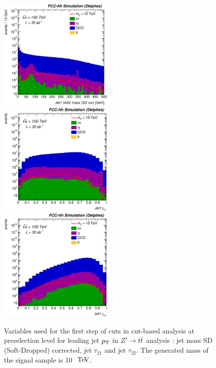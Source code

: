\documentclass{cernrep}
\begin{document}
\begin{figure}[!htb]\centering
\includegraphics[width=0.495\textwidth]{Fig/Zptt/Jet1_trk02_SD_Cor_m_sel0_nostack_log.eps}
\includegraphics[width=0.495\textwidth]{Fig/Zptt/Jet1_tau21_sel0_nostack_log.eps}
\includegraphics[width=0.495\textwidth]{Fig/Zptt/Jet1_tau32_sel0_nostack_log.eps}
\caption{Variables used for the first step of cuts in cut-based analysis at preselection level for leading jet $p\sb{\scriptstyle\mathrm{T}}$ in $Z^{\prime} \rightarrow t\bar{t}$ analysis : jet mass SD (Soft-Dropped) corrected, jet $\tau_{21}$ and jet $\tau_{32}$. The generated mass of the signal sample is 10 $\TeV$.}
\label{fig:Zptt_sel0_cut}
\end{figure}
\end{document}
